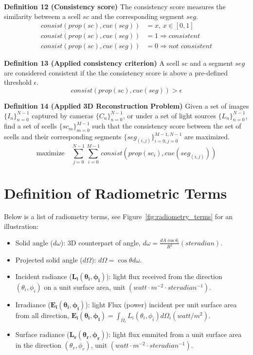 \noindent\textbf{Definition 12 (Consistency score)} The consistency score measures the similarity betweem a scell $sc$ and the corresponding segment $seg$.
\begin{align*}
consist(prop(sc), cue(seg)) &= x \text{, } x\in[0, 1]\\
consist(prop(sc), cue(seg)) &= 1 \Rightarrow \textit{consistent}\\
consist(prop(sc), cue(seg)) &= 0 \Rightarrow \textit{not consistent}
\end{align*}

\noindent\textbf{Definition 13 (Applied consistency criterion)} A scell $sc$ and a segment $seg$ are considered consistent if the the consistency score is above a pre-defined threshold $\epsilon$.
$$
consist(prop(sc), cue(seg)) > \epsilon
$$


\noindent\textbf{Definition 14 (Applied 3D Reconstruction Problem)} Given a set of images $\{I_n\}_{n=0}^{N-1}$ captured by cameras $\{C_n\}_{n=0}^{N-1}$, or under a set of light sources $\{L_n\}_{n=0}^{N-1}$, find a set of scells $\{sc_m\}_{m=0}^{M-1}$ such that the consistency score between the set of scells and their corresponding segments $\{seg_{(i, j)}\}_{i=0,j=0}^{M-1,N-1}$ are maximized.
$$
\mbox{maximize} \quad \sum_{j=0}^{N-1}\sum_{i=0}^{M-1} consist(prop(sc_i), cue(seg_{(i, j)}))
$$

\section{Definition of Radiometric Terms}
\label{sec:radio_term}
Below is a list of radiometry terms, see Figure~\ref{fig:radiometry_terms} for an illustration:
\begin{itemize}
\item Solid angle ($d\omega$): 3D counterpart of angle, $d\omega=\frac{dA \cos\theta_i}{R^2}\mathit{ (steradian)}$.
\item Projected solid angle ($d\Omega$): $d\Omega = \cos\theta d\omega$.
\item Incident radiance ($\mathbf{L_i(\theta_i, \phi_i)}$): light flux received from the direction $(\theta_i, \phi_i)$ on a unit surface area, unit $\mathit{ (watt\cdot m^{-2}\cdot steradian^{-1})}$.
\item Irradiance ($\mathbf{E_i(\theta_i, \phi_i)}$): light Flux (power) incident per unit surface area from all direction, $\mathbf{E_i(\theta_i, \phi_i)}=\int_{\Omega_i} L_i(\theta_i, \phi_i) d\Omega_i \mathit{ (watt/m^2)}$.
\item Surface radiance ($\mathbf{L_r(\theta_r, \phi_r)}$): light flux emmited from a unit surface area in the direction $(\theta_r, \phi_r)$, unit $\mathit{ (watt\cdot m^{-2}\cdot steradian^{-1})}$.
\end{itemize}

